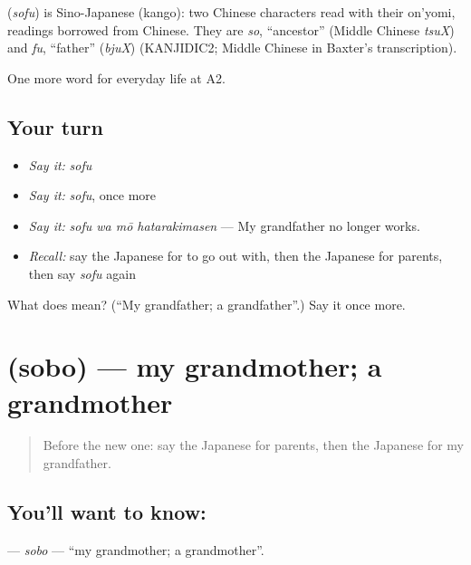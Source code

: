 \begin{cousinweb}
\textbf{} (\emph{sofu}) is Sino-Japanese (kango): two Chinese characters read with their on'yomi, readings borrowed from Chinese. They are \emph{so}, \textquotedblleft{}ancestor\textquotedblright{} (Middle Chinese \emph{tsuX}) and \emph{fu}, \textquotedblleft{}father\textquotedblright{} (\emph{bjuX}) (KANJIDIC2; Middle Chinese in Baxter's transcription).
\end{cousinweb}

\begin{grammarlens}[title={What you've built}]
One more word for everyday life at A2.
\end{grammarlens}

\subsection*{Your turn}
\begin{itemize}
\raggedright
  \item \emph{Say it:} \emph{sofu}
  \item \emph{Say it:} \emph{sofu}, once more
  \item \emph{Say it:} \emph{sofu wa mō hatarakimasen} — My grandfather no longer works.
  \item \emph{Recall:} say the Japanese for to go out with, then the Japanese for parents, then say \emph{sofu} again
\end{itemize}

\begin{tcolorbox}[breakable,colback=teal!4,colframe=teal!35!black,title={Before you move on}]
What does  mean? (\textquotedblleft{}My grandfather; a grandfather\textquotedblright{}.) Say it once more.
\end{tcolorbox}
\section[\texorpdfstring{\ja{そぼ} (sobo)}{そぼ (sobo)}]{ (sobo) — my grandmother; a grandmother}

\label{lesson:JA-C243-sobo}



\begin{quote}
Before the new one: say the Japanese for parents, then the Japanese for my grandfather.
\end{quote}

\subsection*{You'll want to know: }
\textbf{} — \emph{sobo} — \textquotedblleft{}my grandmother; a grandmother\textquotedblright{}.

